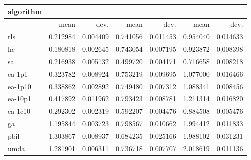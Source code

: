 \begin{tabular}{@{}l*{6}{>{{}}N{1}{2}}@{}}
\toprule
{algorithm} &  &  &  \\
\midrule
& {mean} & {dev.} & {mean} & {dev.} & {mean} & {dev.} \\
\midrule
rls & 0.212984 & 0.004409 & 0.741056 & 0.011453 & 0.954040 & 0.014633 \\
 hc & 0.180818 & 0.002645 & 0.743054 & 0.007195 & 0.923872 & 0.008398 \\
 sa & 0.216938 & 0.005132 & 0.499720 & 0.004171 & 0.716658 & 0.008218 \\
 ea-1p1 & 0.323782 & 0.008924 & 0.753219 & 0.009695 & 1.077000 & 0.016466 \\
 ea-1p10 & 0.338862 & 0.002892 & 0.749480 & 0.007312 & 1.088341 & 0.008456 \\
 ea-10p1 & 0.417892 & 0.011962 & 0.793423 & 0.008781 & 1.211314 & 0.016820 \\
 ea-1c10 & 0.292302 & 0.002319 & 0.592207 & 0.004476 & 0.884508 & 0.005476 \\
 ga & 1.195844 & 0.003723 & 0.798567 & 0.010662 & 1.994412 & 0.011833 \\
 pbil & 1.303867 & 0.008937 & 0.684235 & 0.025166 & 1.988102 & 0.031231 \\
 umda & 1.281901 & 0.006311 & 0.736718 & 0.007707 & 2.018619 & 0.011136 \\
 \bottomrule
\end{tabular}
